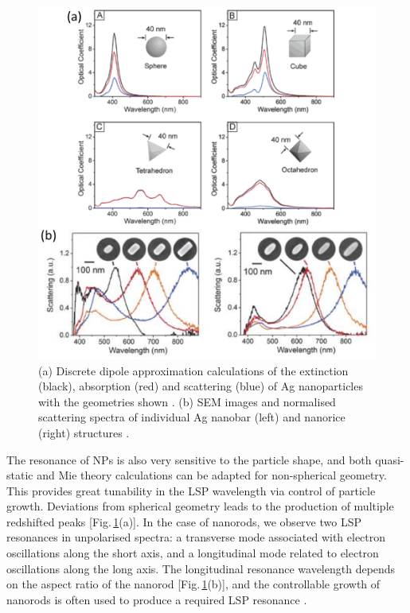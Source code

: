 \begin{figure}[h!] 
\centering    
\includegraphics[width=\textwidth]{Fig10}
\caption{(a) Discrete dipole approximation calculations of the extinction (black), absorption (red) and scattering (blue) of Ag nanoparticles with the geometries shown \cite{Wiley2006}. (b) SEM images and normalised scattering spectra of individual Ag nanobar (left) and nanorice (right) structures \cite{Wiley2007}.}
\label{3Fig10}
\end{figure}
The resonance of NPs is also very sensitive to the particle shape, and both quasi-static and Mie theory calculations can be adapted for non-spherical geometry. This provides great tunability in the LSP wavelength via control of particle growth. Deviations from spherical geometry leads to the production of multiple redshifted peaks [Fig.\,\ref{3Fig10}(a)]. In the case of nanorods, we observe two LSP resonances in unpolarised spectra: a transverse mode associated with electron oscillations along the short axis, and a longitudinal mode related to electron oscillations along the long axis. The longitudinal resonance wavelength depends on the aspect ratio of the nanorod [Fig.\,\ref{3Fig10}(b)], and the controllable growth of nanorods is often used to produce a required LSP resonance \cite{Wiley2006, Wiley2007, Chen2013}.



